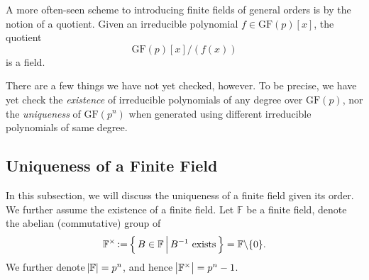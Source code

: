 \begin{remark}
    A more often-seen scheme to introducing finite fields of general orders is by the notion of a quotient. Given an irreducible polynomial $f\in\mathrm{GF}(p)[x]$, the quotient
    \begin{equation}
        \mathrm{GF}(p)[x] / (f(x))
    \end{equation}
    is a field.
\end{remark}

There are a few things we have not yet checked, however. To be precise, we have yet check the \textit{existence} of irreducible polynomials of any degree over $\mathrm{GF}(p)$, nor the \textit{uniqueness} of $\mathrm{GF}(p^n)$ when generated using different irreducible polynomials of same degree.

\subsection{Uniqueness of a Finite Field}
In this subsection, we will discuss the uniqueness of a finite field given its order. We further assume the existence of a finite field. Let $\mathbb{F}$ be a finite field, denote the abelian (commutative) group of
\begin{equation}
    \mathbb{F}^\times \operatorname{\vcentcolon=} \left\{\,{B\in\mathbb{F}}\,\middle\vert\,{B^{-1}\text{ exists}}\,\right\} = \mathbb{F}\backslash \{0\}.
\end{equation}
We further denote $\abs{\mathbb{F}}=p^n$, and hence $\abs{\mathbb{F}^\times}=p^n-1$.

